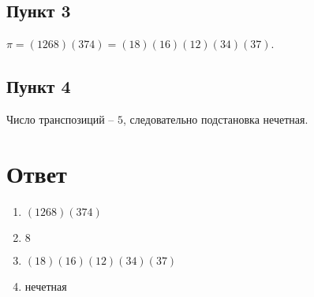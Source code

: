 \documentclass{article}
\begin{document}
\subsection*{Пункт 3}
$\pi = (1268)(374) = (18)(16)(12)(34)(37)$.

\subsection*{Пункт 4}
Число транспозиций -- $5$, следовательно подстановка нечетная.


\section*{Ответ}
\begin{enumerate}
    \item $(1268)(374)$
    \item $8$
    \item $(18)(16)(12)(34)(37)$
    \item нечетная
\end{enumerate}
\end{document}
